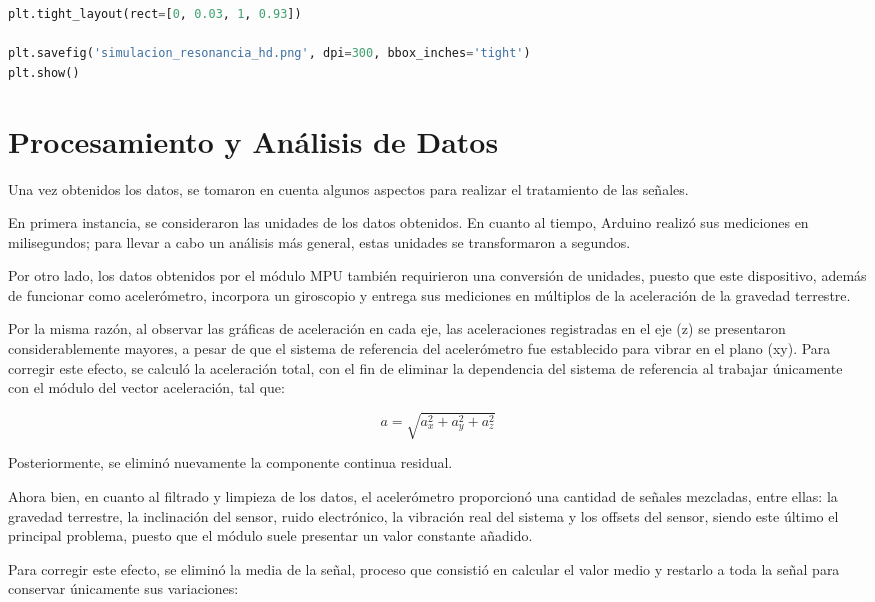 \documentclass[10pt]{article}
\begin{document}
\begin{multicols}{2}
\begin{lstlisting}[language=Python, caption={Algoritmo de integración numérica y análisis espectral FFT en Python.}, label={code:simulacion_oscilador}]
plt.tight_layout(rect=[0, 0.03, 1, 0.93])

plt.savefig('simulacion_resonancia_hd.png', dpi=300, bbox_inches='tight')
plt.show()
\end{lstlisting}
\section{Procesamiento y Análisis de Datos}
Una vez obtenidos los datos, se tomaron en cuenta algunos aspectos para realizar el tratamiento de las señales.

En primera instancia, se consideraron las unidades de los datos obtenidos. En cuanto al tiempo, Arduino realizó sus mediciones en milisegundos; para llevar a cabo un análisis más general, estas unidades se transformaron a segundos.

Por otro lado, los datos obtenidos por el módulo MPU también requirieron una conversión de unidades, puesto que este dispositivo, además de funcionar como acelerómetro, incorpora un giroscopio y entrega sus mediciones en múltiplos de la aceleración de la gravedad terrestre.

Por la misma razón, al observar las gráficas de aceleración en cada eje, las aceleraciones registradas en el eje (z) se presentaron considerablemente mayores, a pesar de que el sistema de referencia del acelerómetro fue establecido para vibrar en el plano (xy). Para corregir este efecto, se calculó la aceleración total, con el fin de eliminar la dependencia del sistema de referencia al trabajar únicamente con el módulo del vector aceleración, tal que:

\begin{equation}
a = \sqrt{a_x^2 + a_y^2 + a_z^2}
\end{equation}

Posteriormente, se eliminó nuevamente la componente continua residual.

Ahora bien, en cuanto al filtrado y limpieza de los datos, el acelerómetro proporcionó una cantidad de señales mezcladas, entre ellas: la gravedad terrestre, la inclinación del sensor, ruido electrónico, la vibración real del sistema y los offsets del sensor, siendo este último el principal problema, puesto que el módulo suele presentar un valor constante añadido.

Para corregir este efecto, se eliminó la media de la señal, proceso que consistió en calcular el valor medio y restarlo a toda la señal para conservar únicamente sus variaciones:


\end{multicols}
\end{document}
